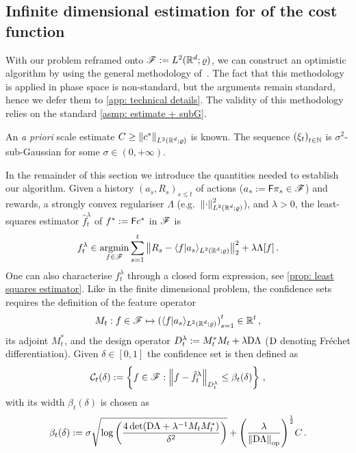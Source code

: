 \subsection{Infinite dimensional estimation for of the cost function}\label{subsec: algorithmic design}

With our problem reframed onto $\mathscr{F}:=L^2(\mathbb{R}^d;\varrho)$, we can construct an optimistic algorithm by using the general methodology of~\cite{abbasi-yadkori_online_2012}. The fact that this methodology is applied in phase space is non-standard, but the arguments remain standard, hence we defer them to \cref{app: technical details}. The validity of this methodology relies on the standard \cref{asmp: estimate + subG}. 

\begin{assumption}\label{asmp: estimate + subG}
    An \textit{a priori} scale estimate $C\ge \left\lVert c^*\right\rVert_{L^2(\mathbb{R}^d;\varrho)}$ is known. The sequence ${(\xi_t)}_{t\in\mathbb{N}}$ is $\sigma^2$-sub-Gaussian for some $\sigma\in(0,+\infty)$.
\end{assumption}

In the remainder of this section we introduce the quantities needed to establish our algorithm.
Given a history ${(a_s,R_s)}_{s\le t}$ of actions ($a_s:=\mathsf{F}\pi_s\in\mathscr{F}$) and rewards, a strongly convex regulariser $\Lambda$ (e.g.\ $\left\lVert\cdot\right\rVert^2_{L^2(\mathbb{R}^d;\varrho)}$), and $\lambda>0$, the least-squares estimator $\hat f_t^\lambda$ of $f^*:=\mathsf{F} c^*$ in $\mathscr{F}$ is
\begin{align}
    f_t^\lambda\in \operatorname*{argmin}_{f\in\mathscr{F}}\sum_{s=1}^t\left\lVert R_s - \langle f\vert a_s\rangle_{L^2(\mathbb{R}^d;\varrho)}\right\rVert^2_2 + \lambda\Lambda[f] \,.\label{eq: RLS estimator}
\end{align}
One can also characterise $f_t^\lambda$ through a closed form expression, see \cref{prop: least squares estimator}. 
Like in the finite dimensional problem, the confidence sets requires the definition of the feature operator
\begin{align}
    M_t: f\in \mathscr{F} \mapsto {(\langle f\vert a_s \rangle_{L^2(\mathbb{R}^d;\varrho)})}_{s=1}^t\in\mathbb{R}^t\,, \label{eq: Mt and adjoint}
\end{align}
its adjoint $M_t^*$, and the design operator $D_t^\lambda:=M_t^*M_t + \lambda\mathrm{D}\Lambda$ ($\mathrm{D}$ denoting Fréchet differentiation). Given $\delta\in[0,1]$ the confidence set is then defined as
\begin{align}
    \mathcal{C}_t(\delta):=\left\{f\in\mathscr{F}: \left\lVert f-\hat f_t^\lambda\right\rVert_{D^\lambda_t}\le \beta_t(\delta)\right\}\,,\label{eq: confidence set}
\end{align}
with its width $\beta_t(\delta)$ is chosen as
\begin{align}
    \beta_t(\delta):=\sigma\sqrt{\log\left(\frac{4\det(\mathrm{D}\Lambda+\lambda^{-1}M_t M^*_t)}{\delta^2}\right)} +{\left(\frac{\lambda}{\left\lVert\mathrm{D}\Lambda\right\rVert_{{\rm op}}}\right)}^{\frac12}C\,. \label{eq: confidence set width def}
\end{align}

